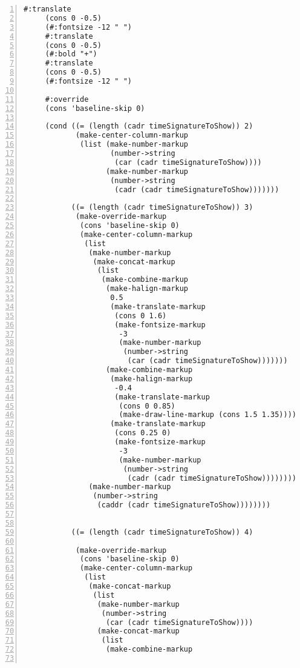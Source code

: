 \begin{Verbatim}[numbers=left,xleftmargin=5mm]
     #:translate
     (cons 0 -0.5)
     (#:fontsize -12 " ")
     #:translate
     (cons 0 -0.5)
     (#:bold "+")
     #:translate
     (cons 0 -0.5)
     (#:fontsize -12 " ")

     #:override
     (cons 'baseline-skip 0)

     (cond ((= (length (cadr timeSignatureToShow)) 2)
            (make-center-column-markup
             (list (make-number-markup
                    (number->string
                     (car (cadr timeSignatureToShow))))
                   (make-number-markup
                    (number->string
                     (cadr (cadr timeSignatureToShow)))))))

           ((= (length (cadr timeSignatureToShow)) 3)
            (make-override-markup
             (cons 'baseline-skip 0)
             (make-center-column-markup
              (list
               (make-number-markup
                (make-concat-markup
                 (list
                  (make-combine-markup
                   (make-halign-markup
                    0.5
                    (make-translate-markup
                     (cons 0 1.6)
                     (make-fontsize-markup
                      -3
                      (make-number-markup
                       (number->string
                        (car (cadr timeSignatureToShow)))))))
                   (make-combine-markup
                    (make-halign-markup
                     -0.4
                     (make-translate-markup
                      (cons 0 0.85)
                      (make-draw-line-markup (cons 1.5 1.35))))
                    (make-translate-markup
                     (cons 0.25 0)
                     (make-fontsize-markup
                      -3
                      (make-number-markup
                       (number->string
                        (cadr (cadr timeSignatureToShow)))))))))))
               (make-number-markup
                (number->string
                 (caddr (cadr timeSignatureToShow))))))))


           ((= (length (cadr timeSignatureToShow)) 4)

            (make-override-markup
             (cons 'baseline-skip 0)
             (make-center-column-markup
              (list
               (make-concat-markup
                (list
                 (make-number-markup
                  (number->string
                   (car (cadr timeSignatureToShow))))
                 (make-concat-markup
                  (list
                   (make-combine-markup


\end{Verbatim}
